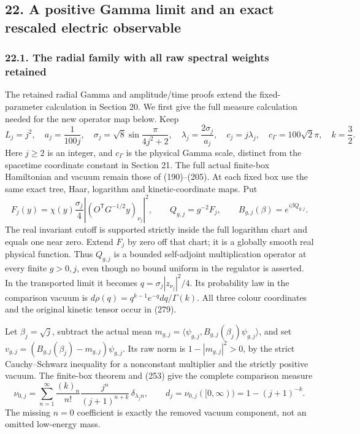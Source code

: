 \documentclass[
  11pt,
]{article}
\begin{document}
\subsection{22. A positive Gamma limit and an exact rescaled electric
observable}\label{a-positive-gamma-limit-and-an-exact-rescaled-electric-observable}

\subsubsection{22.1. The radial family with all raw spectral weights
retained}\label{the-radial-family-with-all-raw-spectral-weights-retained}

The retained radial Gamma and amplitude/time proofs extend the
fixed-parameter calculation in Section 20. We first give the full
measure calculation needed for the new operator map below. Keep \[
 L_j=j^2,\quad a_j=\frac1{100j},\quad
 \sigma_j=\sqrt8\sin\frac{\pi}{4j^2+2},\quad
 \lambda_j=\frac{2\sigma_j}{a_j},\quad
 c_j=j\lambda_j,\quad c_\Gamma=100\sqrt2\pi,\quad k=\frac32 .
 \tag{278}
\] Here \(j\ge2\) is an integer, and \(c_\Gamma\) is the physical Gamma
scale, distinct from the spacetime coordinate constant in Section 21.
The full actual finite-box Hamiltonian and vacuum remain those of
(190)--(205). At each fixed box use the same exact tree, Haar, logarithm
and kinetic-coordinate maps. Put \[
 F_j(y)=\chi(y)\frac{\sigma_j}{4}
       |(O^{\mathsf T}G^{-1/2}y)_{\nu_j}|^2,\qquad
 Q_{g,j}=g^{-2}F_j,\qquad
 B_{g,j}(\beta)=e^{i\beta Q_{g,j}} .
 \tag{279}
\] The real invariant cutoff is supported strictly inside the full
logarithm chart and equals one near zero. Extend \(F_j\) by zero off
that chart; it is a globally smooth real physical function. Thus
\(Q_{g,j}\) is a bounded self-adjoint multiplication operator at every
finite \(g>0,j\), even though no bound uniform in the regulator is
asserted. In the transported limit it becomes
\(q=\sigma_j|z_{\nu_j}|^2/4\). Its probability law in the comparison
vacuum is \(d\rho(q)=q^{k-1}e^{-q}dq/\Gamma(k)\). All three colour
coordinates and the original kinetic tensor occur in (279).

Let \(\beta_j=\sqrt j\), subtract the actual mean
\(m_{g,j}=\langle\psi_{g,j},B_{g,j}(\beta_j)\psi_{g,j}\rangle\), and set
\(v_{g,j}=(B_{g,j}(\beta_j)-m_{g,j})\psi_{g,j}\). Its raw norm is
\(1-|m_{g,j}|^2>0\), by the strict Cauchy--Schwarz inequality for a
nonconstant multiplier and the strictly positive vacuum. The finite-box
theorem and (253) give the complete comparison measure \[
 \nu_{0,j}=\sum_{n=1}^{\infty}
 \frac{(k)_n}{n!}\frac{j^n}{(j+1)^{n+k}}\,
 \delta_{\lambda_j n},\qquad
 d_j=\nu_{0,j}([0,\infty))=1-(j+1)^{-k}.
 \tag{280}
\] The missing \(n=0\) coefficient is exactly the removed vacuum
component, not an omitted low-energy mass.
\end{document}
